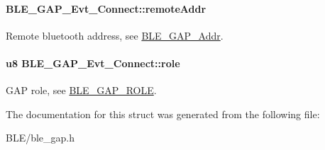 \paragraph[{\texorpdfstring{remote\+Addr}{remoteAddr}}]{ B\+L\+E\+\_\+\+G\+A\+P\+\_\+\+Evt\+\_\+\+Connect\+::remote\+Addr}\hypertarget{struct_b_l_e___g_a_p___evt___connect_ae0a227aef87cce09e94203e8b5387c02}{}\label{struct_b_l_e___g_a_p___evt___connect_ae0a227aef87cce09e94203e8b5387c02}
Remote bluetooth address, see \hyperlink{struct_b_l_e___g_a_p___addr}{B\+L\+E\+\_\+\+G\+A\+P\+\_\+\+Addr}. 
\paragraph[{\texorpdfstring{role}{role}}]{\setlength{\rightskip}{0pt plus 5cm}u8 B\+L\+E\+\_\+\+G\+A\+P\+\_\+\+Evt\+\_\+\+Connect\+::role}\hypertarget{struct_b_l_e___g_a_p___evt___connect_a828ed427f121650cd78ceb07bb961cd6}{}\label{struct_b_l_e___g_a_p___evt___connect_a828ed427f121650cd78ceb07bb961cd6}
G\+AP role, see \hyperlink{group___b_l_e___g_a_p___r_o_l_e}{B\+L\+E\+\_\+\+G\+A\+P\+\_\+\+R\+O\+LE}. 

The documentation for this struct was generated from the following file\+:\begin{DoxyCompactItemize}
\item 
B\+L\+E/ble\+\_\+gap.\+h\end{DoxyCompactItemize}
